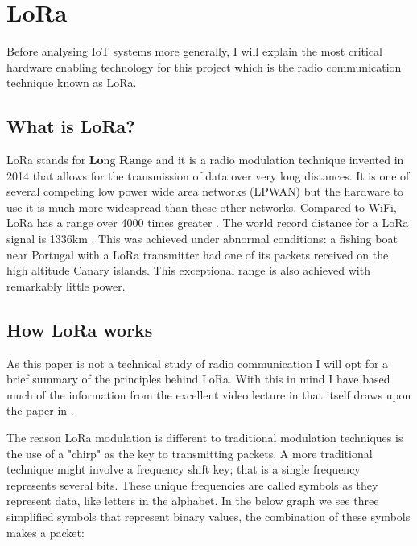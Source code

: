 \section{LoRa}

Before analysing IoT systems more generally, I will explain the most critical
hardware enabling technology for this project which is the radio communication
technique known as LoRa.

\subsection{What is LoRa?}

LoRa stands for \textbf{Lo}ng \textbf{Ra}nge and it is a radio modulation
technique invented in 2014 that allows for the transmission of data over very
long distances. It is one of several competing low power wide area networks
(LPWAN) but the hardware to use it is much more widespread than these other
networks. Compared to WiFi, LoRa has a range over 4000 times greater
\cite{spiess2019}. The world record distance for a LoRa signal is 1336km
\cite{ttn2023}. This was achieved under abnormal conditions: a fishing boat near
Portugal with a LoRa transmitter had one of its packets received on the high
altitude Canary islands. This exceptional range is also achieved with remarkably
little power.

\subsection{How LoRa works}

As this paper is not a technical study of radio communication I will opt for a
brief summary of the principles behind LoRa. With this in mind I have based much
of the information from the excellent video lecture in \cite{visualelectric2021}
that itself draws upon the paper in \cite{vangelista2017}.

The reason LoRa modulation is different to traditional modulation techniques is
the use of a "chirp" as the key to transmitting packets. A more traditional
technique might involve a frequency shift key; that is a single frequency
represents several bits. These unique frequencies are called symbols as they
represent data, like letters in the alphabet. In the below graph we see three
simplified symbols that represent binary values, the combination of these
symbols makes a packet:

